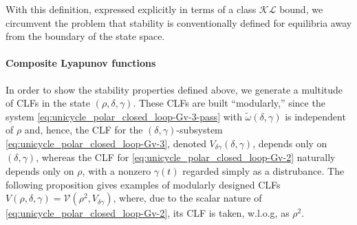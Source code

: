 \documentclass[letterpaper, 10 pt, conference]{ieeeconf}  %
\begin{document}
With this definition, expressed explicitly in terms of a class $\mathcal{KL}$ bound, we circumvent the problem that stability is conventionally defined for equilibria away from the boundary of the state space. 

\paragraph{Composite Lyapunov functions}
In order to show the stability properties defined above, we generate a multitude of CLFs in the state $(\rho,\delta,\gamma)$. These CLFs are built ``modularly,'' since the system \eqref{eq:unicycle_polar_closed_loop-Gv-3-pass} with $\tilde\omega(\delta,\gamma)$ is independent of $\rho$ and, hence, the CLF for the $(\delta,\gamma)$-subsystem \eqref{eq:unicycle_polar_closed_loop-Gv-3}, denoted $V_{\delta\gamma}(\delta,\gamma)$, depends only on  $(\delta,\gamma)$, whereas the CLF for \eqref{eq:unicycle_polar_closed_loop-Gv-2}
naturally depends only on $\rho$, with a nonzero $\gamma(t)$ regarded simply as a distrubance. 
The following proposition gives examples of modularly designed CLFs $V(\rho,\delta,\gamma) = \mathcal{V}(\rho^2,V_{\delta\gamma})$, where, due to the scalar nature of \eqref{eq:unicycle_polar_closed_loop-Gv-2}, its CLF is taken, w.l.o.g, as $\rho^2$. 
\end{document}
